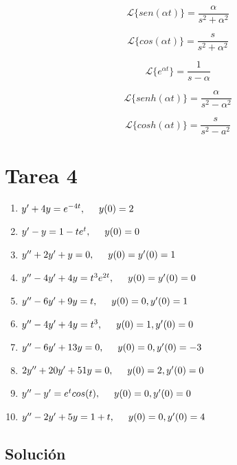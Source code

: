 \documentclass{article}
\begin{document}
\[
    \mathcal{L}\{sen(\alpha t)\} = \frac{\alpha}{s^2 + \alpha^2}
\]

\[
    \mathcal{L}\{cos(\alpha t)\} = \frac{s}{s^2 + \alpha^2}
\]

\[
    \mathcal{L}\{e^{\alpha t}\} = \frac{1}{s - \alpha}
\]

\[
    \mathcal{L}\{senh(\alpha t)\} = \frac{\alpha}{s^2 - \alpha^2}
\]

\[
    \mathcal{L}\{cosh(\alpha t)\} = \frac{s}{s^2 - a^2}
\]

\newpage

\section{Tarea 4}

\begin{enumerate}
    \item $y' + 4y = e^{-4t}, \hspace{.5cm} y(0) = 2$
    \item $y' - y = 1 - te^{t}, \hspace{.5cm} y(0) = 0$
    \item $y'' + 2y' + y = 0, \hspace{.5cm} y(0) = y'(0) = 1$
    \item $y'' - 4y' + 4y = t^{3}e^{2t}, \hspace{.5cm} y(0) = y'(0) = 0 $
    \item $y'' - 6y' + 9y = t, \hspace{.5cm} y(0) = 0, y'(0) = 1$
    \item $y'' - 4y' + 4y = t^3, \hspace{.5cm} y(0) = 1, y'(0) = 0 $
    \item $y'' - 6y' + 13y = 0, \hspace{.5cm} y(0) = 0, y'(0) = -3$
    \item $2y'' + 20y' + 51y = 0, \hspace{.5cm} y(0) = 2, y'(0) = 0$
    \item $y'' - y' = e^{t}cos(t), \hspace{.5cm} y(0) = 0, y'(0) = 0 $
    \item $y'' - 2y' + 5y = 1 + t, \hspace{.5cm} y(0) = 0, y'(0) = 4$
\end{enumerate}

\newpage

\subsection{Solución}
\end{document}
